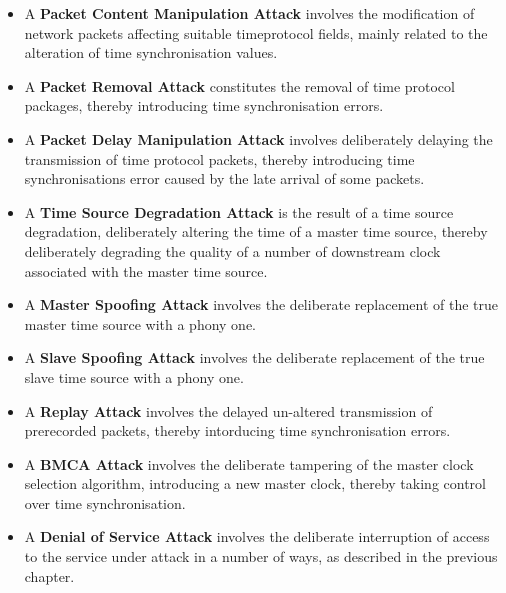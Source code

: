 \begin{itemize}

\item A \textbf{Packet Content Manipulation Attack} involves the modification of network packets affecting suitable timeprotocol fields, mainly related to the alteration of time synchronisation values. 
\item A \textbf{Packet Removal Attack} constitutes the removal of time protocol packages, thereby introducing time synchronisation errors.
\item A \textbf{Packet Delay Manipulation Attack} involves deliberately delaying the transmission of time protocol packets, thereby introducing time synchronisations error caused by the late arrival of some packets.
\item A \textbf{Time Source Degradation Attack} is the result of a time source degradation, deliberately altering the time of a master time source, thereby deliberately degrading the quality of a number of downstream clock associated with the master time source. 
\item A \textbf{Master Spoofing Attack} involves the deliberate replacement of the true master time source with a phony one.   
\item A \textbf{Slave Spoofing Attack} involves the deliberate replacement of the true slave time source with a phony one. 
\item A \textbf{Replay Attack} involves the delayed un-altered transmission of prerecorded packets, thereby intorducing time synchronisation errors.
\item A \textbf{BMCA Attack} involves the deliberate tampering of the master clock selection algorithm, introducing a new master clock, thereby taking control over time synchronisation.
\item A \textbf{Denial of Service Attack} involves the deliberate interruption of access to the service under attack in a number of ways, as described in the previous chapter.
\end{itemize}



